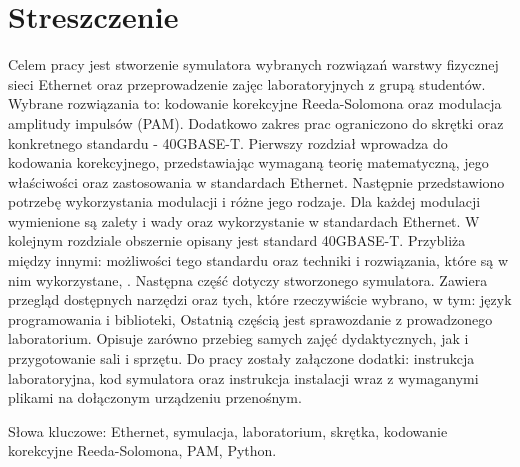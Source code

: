 \section*{Streszczenie}

Celem pracy jest stworzenie symulatora wybranych rozwiązań warstwy fizycznej sieci Ethernet oraz przeprowadzenie zajęc laboratoryjnych z grupą studentów. Wybrane rozwiązania to: kodowanie korekcyjne Reeda-Solomona oraz modulacja amplitudy impulsów (PAM). Dodatkowo zakres prac ograniczono do skrętki oraz konkretnego standardu - 40GBASE-T. Pierwszy rozdział wprowadza do kodowania korekcyjnego, przedstawiając wymaganą teorię matematyczną, jego właściwości oraz zastosowania w standardach Ethernet. Następnie przedstawiono potrzebę wykorzystania modulacji i różne jego rodzaje. Dla każdej modulacji wymienione są zalety i wady oraz wykorzystanie w standardach Ethernet. W kolejnym rozdziale obszernie opisany jest standard 40GBASE-T. Przybliża między innymi: możliwości tego standardu oraz techniki i rozwiązania, które są w nim wykorzystane, . Następna część dotyczy stworzonego symulatora. Zawiera przegląd dostępnych narzędzi oraz tych, które rzeczywiście wybrano, w tym: język programowania i biblioteki, Ostatnią częścią jest sprawozdanie z prowadzonego laboratorium. Opisuje zarówno przebieg samych zajęć dydaktycznych, jak i przygotowanie sali i sprzętu. Do pracy zostały załączone dodatki: instrukcja laboratoryjna, kod symulatora oraz instrukcja instalacji wraz z wymaganymi plikami na dołączonym urządzeniu przenośnym.

Słowa kluczowe: Ethernet, symulacja, laboratorium, skrętka, kodowanie korekcyjne Reeda-Solomona, PAM, Python.
